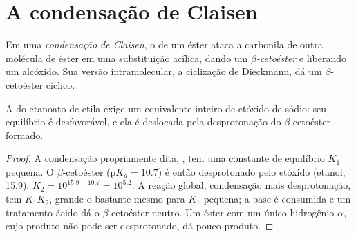 \section{A condensação de Claisen}

\begin{definition}\label{def:b2:enolates-aldol:claisen}
Em uma \emph{condensação de Claisen}, o  de um éster ataca a
carbonila de outra molécula de éster em uma substituição acílica, dando um \emph{$\beta$-cetoéster}
e liberando um alcóxido. Sua versão intramolecular, a ciclização de
Dieckmann, dá um $\beta$-cetoéster cíclico.
\end{definition}

\begin{proposition}\label{prop:b2:enolates-aldol:claisen-drive}
A  do etanoato de etila exige um equivalente inteiro de etóxido de sódio: seu
equilíbrio é desfavorável, e ela é deslocada pela desprotonação do $\beta$-cetoéster formado.
\end{proposition}

\begin{proof}
A condensação propriamente dita, , tem uma constante de equilíbrio
$K_1$ pequena. O $\beta$-cetoéster ($\mathrm pK_a = 10.7$) é então desprotonado pelo etóxido (etanol, 15.9):
$K_2 = 10^{15.9 - 10.7} = 10^{5.2}$. A reação global, condensação mais desprotonação, tem
$K_1K_2$, grande o bastante mesmo para $K_1$ pequena; a base é consumida e um tratamento ácido dá o
$\beta$-cetoéster neutro. Um éster com um único hidrogênio $\alpha$, cujo produto não pode ser
desprotonado, dá pouco produto.
\end{proof}

